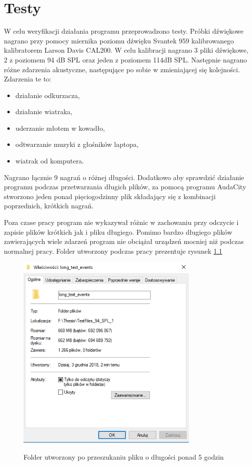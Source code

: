 \documentclass[eng,printmode]{mgr}
\begin{document}
\chapter{Testy}
W celu weryfikacji działania programu przeprowadzono testy. Próbki dźwiękowe nagrano przy pomocy miernika poziomu dźwięku Svantek 959 kalibrowanego kalibratorem Larson Davis CAL200. W celu kalibracji nagrano 3 pliki dźwiękowe, 2 z poziomem 94 dB SPL oraz jeden z poziomem 114dB SPL. Następnie nagrano różne zdarzenia akustyczne, następujące po sobie w zmieniającej się kolejności. Zdarzenia te to:
\begin{itemize}
\item działanie odkurzacza,
\item działanie wiatraka,
\item uderzanie młotem w kowadło,
\item odtwarzanie muzyki z głośników laptopa,
\item wiatrak od komputera.
\end{itemize}

Nagrano łącznie 9 nagrań o różnej długości. Dodatkowo aby sprawdzić działanie programu podczas przetwarzania długich plików, za pomocą programu AudaCity stworzono jeden ponad pięciogodzinny plik składający się z kombinacji poprzednich, krótkich nagrań.

Poza czase pracy program nie wykazywał różnic w zachowaniu przy odczycie i zapisie plików krótkich jak i pliku długiego. Pomimo bardzo długiego plików zawierających wiele zdarzeń program nie obciążał urządzeń mocniej niż podczas normalnej pracy. Folder utworzony podczas pracy prezentuje rysunek \ref{dlugiewyniki}

\begin{figure}[hbtp]
\caption{Folder utworzony po przeszukaniu pliku o długości ponad 5 godzin}
\centering
\includegraphics[width=0.8\textwidth]{long_file_found.PNG}
\label{dlugiewyniki}
\end{figure}
\end{document}
